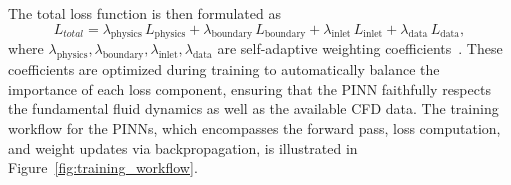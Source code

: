 \documentclass[12pt, a4paper]{article}
\begin{document}
The total loss function is then formulated as
\begin{equation}
L_{total} = \lambda_{\mathrm{physics}}\,L_{\mathrm{physics}} + \lambda_{\mathrm{boundary}}\,L_{\mathrm{boundary}} + \lambda_{\mathrm{inlet}}\,L_{\mathrm{inlet}} + \lambda_{\mathrm{data}}\,L_{\mathrm{data}},
\label{eq:total_loss}
\end{equation}
where \(\lambda_{\mathrm{physics}}, \lambda_{\mathrm{boundary}}, \lambda_{\mathrm{inlet}}, \lambda_{\mathrm{data}}\) are self-adaptive weighting coefficients~\citep{mcclenny2020self}. These coefficients are optimized during training to automatically balance the importance of each loss component, ensuring that the PINN faithfully respects the fundamental fluid dynamics as well as the available CFD data. The training workflow for the PINNs, which encompasses the forward pass, loss computation, and weight updates via backpropagation, is illustrated in Figure~\ref{fig:training_workflow}.





\end{document}
